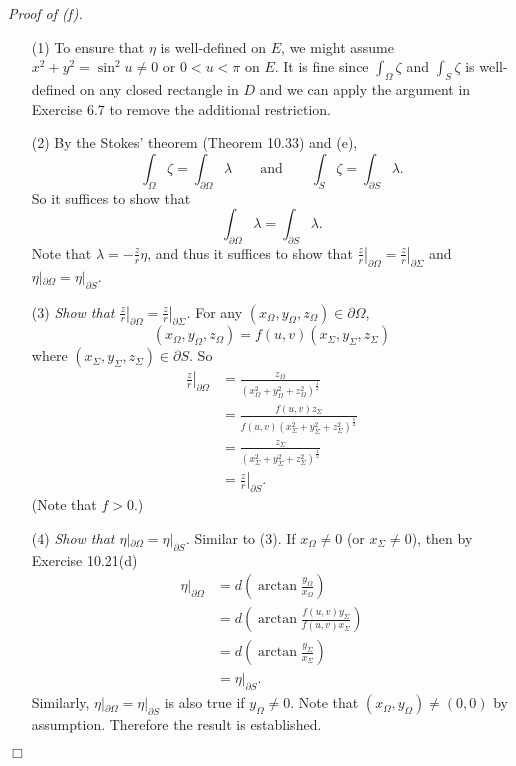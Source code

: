 \documentclass{article}
\begin{document}
\emph{Proof of (f).}
\begin{enumerate}
\item[(1)]
  To ensure that $\eta$ is well-defined on $E$,
  we might assume $x^2+y^2 = \sin^2 u \neq 0$ or $0 < u < \pi$ on $E$.
  It is fine since
  $\int_{\Omega} \zeta$ and $\int_{S} \zeta$ is well-defined on any closed rectangle in $D$
  and we can apply the argument in Exercise 6.7 to remove the additional restriction.

\item[(2)]
  By the Stokes' theorem (Theorem 10.33) and (e),
  \[
    \int_{\Omega} \zeta = \int_{\partial\Omega} \lambda
    \qquad
    \text{and}
    \qquad
    \int_{S} \zeta = \int_{\partial S} \lambda.
  \]
  So it suffices to show that
  \[
    \int_{\partial\Omega} \lambda = \int_{\partial S} \lambda.
  \]
  Note that $\lambda = -\frac{z}{r} \eta$,
  and thus it suffices to show that
  $\left.\frac{z}{r}\right|_{\partial\Omega} = \left.\frac{z}{r}\right|_{\partial\Sigma}$
  and $\eta|_{\partial\Omega} = \eta|_{\partial S}$.

\item[(3)]
  \emph{Show that
  $\left.\frac{z}{r}\right|_{\partial\Omega} = \left.\frac{z}{r}\right|_{\partial\Sigma}$.}
  For any $(x_{\Omega}, y_{\Omega}, z_{\Omega}) \in \partial\Omega$,
  \[
    (x_{\Omega}, y_{\Omega}, z_{\Omega}) = f(u,v)(x_{\Sigma}, y_{\Sigma}, z_{\Sigma})
  \]
  where $(x_{\Sigma}, y_{\Sigma}, z_{\Sigma}) \in \partial S$.
  So
  \begin{align*}
    \left.\frac{z}{r}\right|_{\partial\Omega}
    &= \frac{z_{\Omega}}{(x_{\Omega}^2+y_{\Omega}^2+z_{\Omega}^2)^{\frac{1}{2}}} \\
    &= \frac{f(u,v)z_{\Sigma}}{f(u,v)(x_{\Sigma}^2+y_{\Sigma}^2+z_{\Sigma}^2)^{\frac{1}{2}}} \\
    &= \frac{z_{\Sigma}}{(x_{\Sigma}^2+y_{\Sigma}^2+z_{\Sigma}^2)^{\frac{1}{2}}} \\
    &= \left.\frac{z}{r}\right|_{\partial S}.
  \end{align*}
  (Note that $f > 0$.)

\item[(4)]
  \emph{Show that $\eta|_{\partial\Omega} = \eta|_{\partial S}$.}
  Similar to (3).
  If $x_{\Omega} \neq 0$ (or $x_{\Sigma} \neq 0$),
  then by Exercise 10.21(d)
  \begin{align*}
    \eta|_{\partial\Omega}
    &= d\left(\arctan\frac{y_{\Omega}}{x_{\Omega}}\right) \\
    &= d\left(\arctan\frac{f(u,v)y_{\Sigma}}{f(u,v)x_{\Sigma}}\right) \\
    &= d\left(\arctan\frac{y_{\Sigma}}{x_{\Sigma}}\right) \\
    &= \eta|_{\partial S}.
  \end{align*}
  Similarly, $\eta|_{\partial\Omega} = \eta|_{\partial S}$ is also true if $y_{\Omega} \neq 0$.
  Note that $(x_{\Omega},y_{\Omega}) \neq (0,0)$ by assumption.
  Therefore the result is established.
\end{enumerate}
$\Box$ \\
\end{document}
